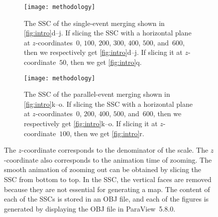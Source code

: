 \documentclass[ijgi,article,submit,moreauthors,pdftex]{Definitions/mdpi}
\begin{document}
\begin{figure}
\centering
\begin{subfigure}[t]{0.48\textwidth}
\centering
\texttt{[image: methodology]}
\caption{The SSC of the single-event merging shown in \figs\ref{fig:intro}d--j.
    If slicing the SSC with a horizontal plane at $z$-coordinates~$0$, 
    $100$, $200$, $300$, $400$, $500$, and~$600$,
    then we respectively get \figs\ref{fig:intro}d--j.
    If slicing it at $z$-coordinate~$50$,
    then we get \fig\ref{fig:intro}q.}
\end{subfigure}
\hfill
\begin{subfigure}[t]{0.48\textwidth}
\centering
\texttt{[image: methodology]}
\caption{The SSC of the parallel-event merging shown in \figs\ref{fig:intro}k--o.    
    If slicing the SSC with a horizontal plane at $z$-coordinates~$0$, 
    $200$,  $400$, $500$, and~$600$,
    then we respectively get \figs\ref{fig:intro}k--o.
    If slicing it at $z$-coordinate~$100$,
    then we get \fig\ref{fig:intro}r.}
\end{subfigure}
\caption{
The $z$-coordinate corresponds to the denominator of the scale.
The $z$-coordinate also corresponds to the animation time of zooming.
The smooth animation of zooming out can be obtained by
slicing the SSC from bottom to top.
In the SSC, the vertical faces are removed 
because they are not essential for generating a map.
The content of each of the SSCs is stored in an OBJ file,
and each of the figures is generated by displaying the OBJ file
in ParaView~5.8.0.}
\label{fig:ssc_smooth_only}
\end{figure}
\end{document}
